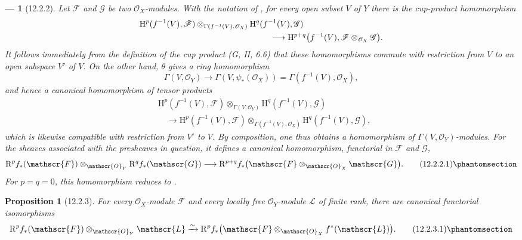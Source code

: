 \documentclass[oneside]{amsart}
\theoremstyle{ega-env-style}
\newtheorem*{env}{---}
\theoremstyle{ega-thm-env-style}
\newtheorem*{proposition}{Proposition}
\theoremstyle{ega-defn-env-style}
\def\mathcal{\mathscr}
\def\sh{\mathcal}                   %
\def\HH{\mathrm{H}}                 %
\def\RR{\mathrm{R}}                 %
\def\simto{\xrightarrow{\sim}}
\newcommand{\oldpage}[2][]{{\marginnote{\normalfont{\textbf{#1}~|~#2}}}\ignorespaces}
\let\EGAOriginalLabel\label
\renewcommand{\label}[1]{\phantomsection\EGAOriginalLabel{#1}}
\begin{document}
\begin{env}[12.2.2]
\label{0.12.2.2}
Let $\sh{F}$ and $\sh{G}$ be two $\sh{O}_X$-modules.
With the notation of , for every open subset $V$ of
$Y$ there is the cup-product homomorphism 
\[
  \begin{aligned}
  &\HH^p(f^{-1}(V),\sh{F})
    \otimes_{\Gamma(f^{-1}(V),\sh{O}_X)}
    \HH^q(f^{-1}(V),\sh{G})\\
  &\hspace{55mm}\longrightarrow
    \HH^{p+q}\bigl(f^{-1}(V),
      \sh{F}\otimes_{\sh{O}_X}\sh{G}\bigr).
  \end{aligned}
\]
\oldpage[0\textsubscript{III}]{58}
It follows immediately from the definition of the cup product
(G, II, 6.6) that these homomorphisms commute with restriction from
$V$ to an open subspace $V'$ of $V$.
On the other hand, $\theta$ gives a ring homomorphism
\[
  \Gamma(V,\sh{O}_Y)
  \longrightarrow\Gamma(V,\psi_*(\sh{O}_X))
  =\Gamma(f^{-1}(V),\sh{O}_X),
\]
and hence a canonical homomorphism of tensor products
\[
  \begin{aligned}
  &\HH^p(f^{-1}(V),\sh{F})
    \otimes_{\Gamma(V,\sh{O}_Y)}
    \HH^q(f^{-1}(V),\sh{G})\\
  &\quad\longrightarrow
    \HH^p(f^{-1}(V),\sh{F})
    \otimes_{\Gamma(f^{-1}(V),\sh{O}_X)}
    \HH^q(f^{-1}(V),\sh{G}),
  \end{aligned}
\]
which is likewise compatible with restriction from $V'$ to $V$.
By composition, one thus obtains a homomorphism of
$\Gamma(V,\sh{O}_Y)$-modules.  For the sheaves associated with the
presheaves in question, it defines a canonical homomorphism,
functorial in $\sh{F}$ and $\sh{G}$,
\[
  \RR^p f_*(\sh{F})\otimes_{\sh{O}_Y}\RR^q f_*(\sh{G})
  \longrightarrow
  \RR^{p+q}f_*
    \bigl(\sh{F}\otimes_{\sh{O}_X}\sh{G}\bigr).
  \tag{12.2.2.1}
  \label{0.12.2.2.1}
\]
For $p=q=0$, this homomorphism reduces to
.
\end{env}

\begin{proposition}[12.2.3]
\label{0.12.2.3}
For every $\sh{O}_X$-module $\sh{F}$ and every locally free
$\sh{O}_Y$-module $\sh{L}$ of finite rank, there are canonical
functorial isomorphisms
\[
  \RR^p f_*(\sh{F})\otimes_{\sh{O}_Y}\sh{L}
  \simto
  \RR^p f_*
    \bigl(\sh{F}\otimes_{\sh{O}_X}f^*(\sh{L})\bigr).
  \tag{12.2.3.1}
  \label{0.12.2.3.1}
\]
\end{proposition}
\end{document}
